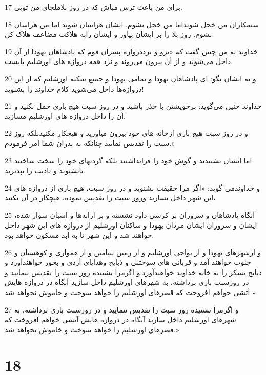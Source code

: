 \par 17 برای من باعث ترس مباش که در روز بلاملجای من تویی.
\par 18 ستمکاران من خجل شونداما من خجل نشوم. ایشان هراسان شوند اما من هراسان نشوم. روز بلا را بر ایشان بیاور و ایشان رابه هلاکت مضاعف هلاک کن.
\par 19 خداوند به من چنین گفت که «برو و نزددروازه پسران قوم که پادشاهان یهودا از آن داخل می‌شوند و از آن بیرون می‌روند و نزد همه دروازه های اورشلیم بایست.
\par 20 و به ایشان بگو: ای پادشاهان یهودا و تمامی یهودا و جمیع سکنه اورشلیم که از این دروازه‌ها داخل می‌شوید کلام خداوند را بشنوید!
\par 21 خداوند چنین می‌گوید: برخویشتن با حذر باشید و در روز سبت هیچ باری حمل نکنید و آن را داخل دروازه های اورشلیم مسازید.
\par 22 و در روز سبت هیچ باری ازخانه های خود بیرون میاورید و هیچکار مکنیدبلکه روز سبت را تقدیس نمایید چنانکه به پدران شما امر فرمودم.»
\par 23 اما ایشان نشنیدند و گوش خود را فرانداشتند بلکه گردنهای خود را سخت ساختند تانشنوند و تادیب را نپذیرند.
\par 24 و خداوندمی گوید: «اگر مرا حقیقت بشنوید و در روز سبت، هیچ باری از دروازه های این شهر داخل نسازید وروز سبت را تقدیس نموده، هیچکار در آن نکنید،
\par 25 آنگاه پادشاهان و سروران بر کرسی داود نشسته و بر ارابه‌ها و اسبان سوار شده، ایشان و سروران ایشان مردان یهودا و ساکنان اورشلیم از دروازه های این شهر داخل خواهند شد و این شهر تا به ابد مسکون خواهد بود. 
\par 26 و ازشهرهای یهودا و از نواحی اورشلیم و از زمین بنیامین و از همواری و کوهستان و جنوب خواهند آمد و قربانی های سوختنی و ذبایح وهدایای آردی و بخور خواهند‌آورد و ذبایح تشکر را به خانه خداوند خواهند‌آورد.و اگرمرا نشنیده روز سبت را تقدیس ننمایید و در روزسبت باری برداشته، به شهرهای اورشلیم داخل سازید آنگاه در دروازه هایش آتشی خواهم افروخت که قصرهای اورشلیم را خواهد سوخت و خاموش نخواهد شد.»
\par 27 و اگرمرا نشنیده روز سبت را تقدیس ننمایید و در روزسبت باری برداشته، به شهرهای اورشلیم داخل سازید آنگاه در دروازه هایش آتشی خواهم افروخت که قصرهای اورشلیم را خواهد سوخت و خاموش نخواهد شد.»
 
\chapter{18}

